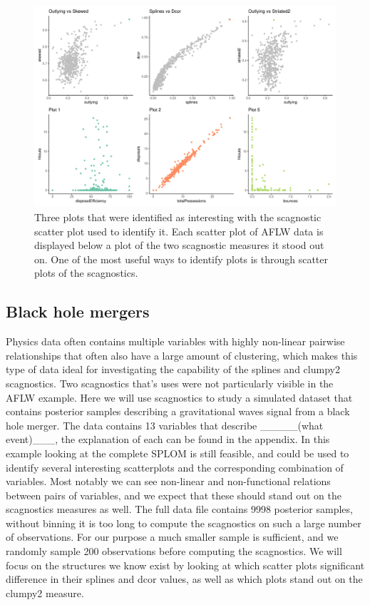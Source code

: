 \begin{Schunk}
\begin{figure}

{\centering \includegraphics[width=0.8\linewidth]{mason-lee-laa-cook_files/figure-latex/threeplot-static-1} 

}

\caption[Three plots that were identified as interesting with the scagnostic scatter plot used to identify it]{Three plots that were identified as interesting with the scagnostic scatter plot used to identify it. Each scatter plot of AFLW data is displayed below a plot of the two scagnostic measures it stood out on. One of the most useful ways to identify plots is through scatter plots of the scagnostics.}\label{fig:threeplot-static}
\end{figure}
\end{Schunk}

\hypertarget{black-hole-mergers}{%
\subsection{Black hole mergers}\label{black-hole-mergers}}

Physics data often contains multiple variables with highly non-linear
pairwise relationships that often also have a large amount of
clustering, which makes this type of data ideal for investigating the
capability of the splines and clumpy2 scagnostics. Two scagnostics
that's uses were not particularly visible in the AFLW example. Here we
will use scagnostics to study a simulated dataset that contains
posterior samples describing a gravitational waves signal from a black
hole merger. The data contains 13 variables that describe
\_\_\_\_\_(what event)\_\_\_, the explanation of each can be found in
the appendix. In this example looking at the complete SPLOM is still
feasible, and could be used to identify several interesting scatterplots
and the corresponding combination of variables. Most notably we can see
non-linear and non-functional relations between pairs of variables, and
we expect that these should stand out on the scagnostics measures as
well. The full data file contains 9998 posterior samples, without
binning it is too long to compute the scagnostics on such a large number
of observations. For our purpose a much smaller sample is sufficient,
and we randomly sample 200 observations before computing the
scagnostics. We will focus on the structures we know exist by looking at
which scatter plots significant difference in their splines and dcor
values, as well as which plots stand out on the clumpy2 measure.

